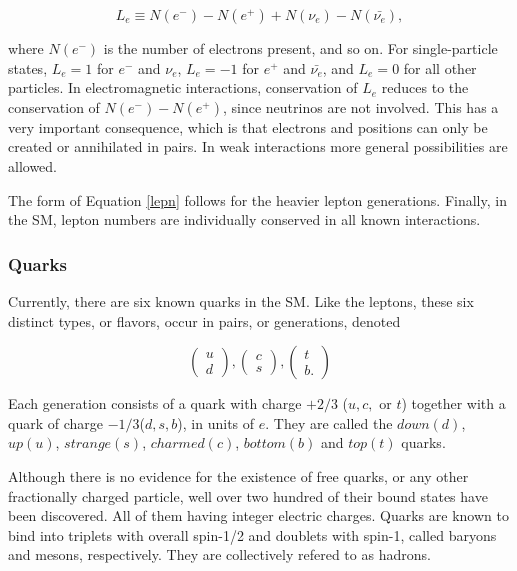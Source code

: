 \begin{equation}
\label{lepn}
L_{e}\equiv N(e^{-}) - N(e^{+}) + N(\nu_{e}) - N(\bar{\nu_{e}}),
\end{equation}

where $N(e^{-})$ is the number of electrons present, and so on. For single-particle states, $L_{e} = 1$ for $e^{-}$ and $\nu_{e}$, $L_{e}=-1$ for $e^{+}$ and $\bar{\nu_{e}}$, and $L_{e}=0$ for all other particles. In electromagnetic interactions, conservation of $L_{e}$ reduces to the conservation of $N(e^{-}) - N(e^{+})$, since neutrinos are not involved. This has a very important consequence, which is that electrons and positions can only be created or annihilated in pairs. In weak interactions more general possibilities are allowed.

The form of Equation \ref{lepn} follows for the heavier lepton generations. Finally, in the SM, lepton numbers are individually conserved in all known interactions.

\subsubsection{Quarks}
Currently, there are six known quarks in the SM. Like the leptons, these six distinct types, or flavors, occur in pairs, or generations, denoted

\begin{equation}
	\begin{pmatrix}
		u\\
		d
	\end{pmatrix},
\begin{pmatrix}
		c\\
		s
	\end{pmatrix},
	\begin{pmatrix}
		t\\
		b.
	\end{pmatrix}
\end{equation}

Each generation consists of a quark with charge $+2/3$ ($u,c,$ or $t$) together with a quark of charge $-1/3$($d,s,b$), in units of $e$. They are called the $down(d)$, $up(u)$, $strange(s)$, $charmed(c)$, $bottom(b)$ and $top(t)$ quarks. 

Although there is no evidence for the existence of free quarks, or any other fractionally charged particle, well over two hundred of their bound states have been discovered. All of them having integer electric charges. Quarks are known to bind into triplets with overall spin-1/2 and doublets with spin-1, called baryons and mesons, respectively. They are collectively refered to as hadrons.

